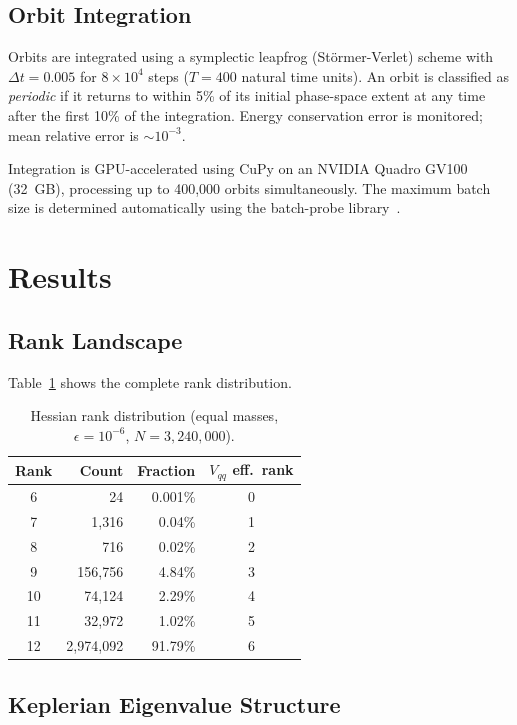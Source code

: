 \documentclass[aps,pre,twocolumn,superscriptaddress,floatfix]{revtex4-2}
\begin{document}
\subsection{Orbit Integration}

Orbits are integrated using a symplectic leapfrog (Störmer-Verlet)
scheme with $\Delta t = 0.005$ for $8 \times 10^4$ steps ($T = 400$
natural time units). An orbit is classified as \emph{periodic} if it
returns to within 5\% of its initial phase-space extent at any time
after the first 10\% of the integration. Energy conservation error
is monitored; mean relative error is $\sim 10^{-3}$.

Integration is GPU-accelerated using CuPy on an NVIDIA Quadro GV100
(32~GB), processing up to 400{,}000 orbits simultaneously. The
maximum batch size is determined automatically using the
batch-probe library~\cite{batchprobe}.

\section{Results}

\subsection{Rank Landscape}

Table~\ref{tab:landscape} shows the complete rank distribution.

\begin{table}[h]
\caption{Hessian rank distribution (equal masses, $\epsilon = 10^{-6}$,
$N = 3{,}240{,}000$).}
\label{tab:landscape}
\begin{ruledtabular}
\begin{tabular}{crrc}
Rank & Count & Fraction & $V_{qq}$ eff.\ rank \\
\hline
6 & 24 & 0.001\% & 0 \\
7 & 1{,}316 & 0.04\% & 1 \\
8 & 716 & 0.02\% & 2 \\
9 & 156{,}756 & 4.84\% & 3 \\
10 & 74{,}124 & 2.29\% & 4 \\
11 & 32{,}972 & 1.02\% & 5 \\
12 & 2{,}974{,}092 & 91.79\% & 6 \\
\end{tabular}
\end{ruledtabular}
\end{table}

\subsection{Keplerian Eigenvalue Structure}
\end{document}
